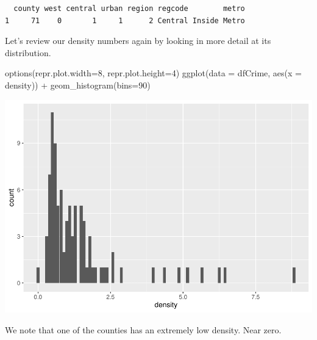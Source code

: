 \documentclass[]{article}
\newenvironment{Shaded}{}{}
\newcommand{\DataTypeTok}[1]{#1}
\newcommand{\DecValTok}[1]{#1}
\newcommand{\FloatTok}[1]{#1}
\newcommand{\KeywordTok}[1]{\textcolor[rgb]{0.00,0.00,1.00}{#1}}
\newcommand{\NormalTok}[1]{#1}
\newcommand{\OperatorTok}[1]{#1}
\newcommand{\StringTok}[1]{\textcolor[rgb]{0.00,0.50,0.50}{#1}}
\begin{document}
\begin{verbatim}
  county west central urban region regcode        metro
1     71    0       1     1      2 Central Inside Metro
\end{verbatim}

Let's review our density numbers again by looking in more detail at its
distribution.

\begin{Shaded}
\begin{Highlighting}[]
\KeywordTok{options}\NormalTok{(}\DataTypeTok{repr.plot.width=}\DecValTok{8}\NormalTok{, }\DataTypeTok{repr.plot.height=}\DecValTok{4}\NormalTok{)}
\KeywordTok{ggplot}\NormalTok{(}\DataTypeTok{data =}\NormalTok{ dfCrime, }\KeywordTok{aes}\NormalTok{(}\DataTypeTok{x =}\NormalTok{ density)) }\OperatorTok{+}\StringTok{ }
\StringTok{      }\KeywordTok{geom_histogram}\NormalTok{(}\DataTypeTok{bins=}\DecValTok{90}\NormalTok{)}
\end{Highlighting}
\end{Shaded}

\includegraphics{Bagnard_Gaustad_Hartman_Leung_Lab_3_files/figure-latex/unnamed-chunk-40-1.pdf}

We note that one of the counties has an extremely low density. Near
zero.

\begin{Shaded}
\end{Shaded}
\end{document}
